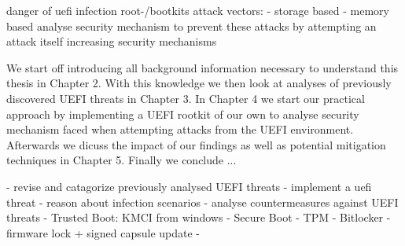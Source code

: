 danger of uefi infection
root-/bootkits
attack vectors:
- storage based
- memory based
analyse security mechanism to prevent these attacks by attempting an attack itself
increasing security mechanisms

We start off introducing all background information necessary to understand this thesis in Chapter 2. With this knowledge we then look at analyses of previously discovered UEFI threats in Chapter 3. In Chapter 4 we start our practical approach by implementing a UEFI rootkit of our own to analyse security mechanism faced when attempting attacks from the UEFI environment. Afterwards we dicuss the impact of our findings as well as potential mitigation techniques in Chapter 5. Finally we conclude ...

- revise and catagorize previously analysed UEFI threats
- implement a uefi threat
- reason about infection scenarios
- analyse countermeasures against UEFI threats
- Trusted Boot: KMCI from windows
- Secure Boot
- TPM
- Bitlocker
- firmware lock + signed capsule update
-